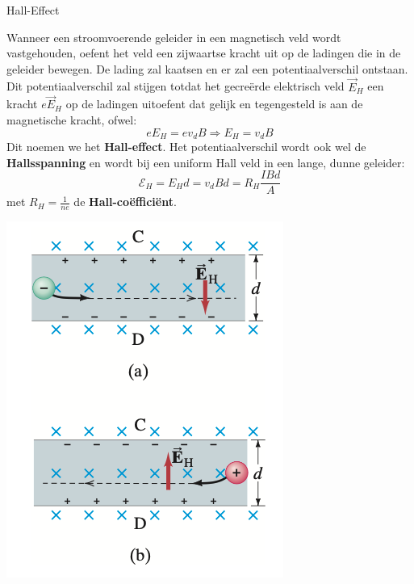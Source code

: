 \begin{theo}{Hall-Effect}
    \begin{minipage}{0.78\textwidth}
        Wanneer een stroomvoerende geleider in een magnetisch veld wordt vastgehouden,
        oefent het veld een zijwaartse kracht uit op de ladingen die in de geleider bewegen.
        De lading zal kaatsen en er zal een potentiaalverschil ontstaan. Dit potentiaalverschil zal
        stijgen totdat het gecreërde elektrisch veld $\Vec{E}_H$ een kracht $e\Vec{E}_H$
        op de ladingen uitoefent dat gelijk en tegengesteld is aan de magnetische kracht, ofwel:
        \begin{equation*}
            eE_H = ev_{d}B \Rightarrow E_H = v_{d}B
        \end{equation*}
        Dit noemen we het \textbf{Hall-effect}. Het potentiaalverschil wordt ook wel de \textbf{Hallsspanning}
        en wordt bij een uniform Hall veld in een lange, dunne geleider:
        \begin{equation*}
            \mathcal{E}_H = E_{H}d = v_{d}Bd = R_H\dfrac{IBd}{A}
        \end{equation*}
        met $R_H = \tfrac{1}{ne}$ de \textbf{Hall-coëfficiënt}.
    \end{minipage}
    \begin{minipage}{.18\textwidth}
        \includegraphics[scale = 0.3]{Images/Magnetisme/HallEffect}
    \end{minipage}
    \vspace{0.2cm}

\end{theo}

